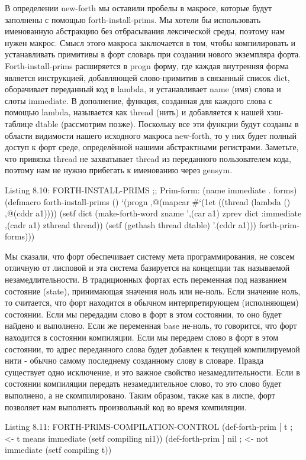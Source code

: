 В определении new-forth мы оставили пробелы в макросе, которые будут заполнены с помощью forth-install-prims. Мы хотели бы использовать именованную абстракцию без отбрасывания лексической среды, поэтому нам нужен макрос. Смысл этого макроса заключается в том, чтобы компилировать и устанавливать примитивы в форт словарь при создании нового экземпляра форта. Forth-install-prims расширяется в progn форму, где каждая внутренняя форма является инструкцией, добавляющей слово-примитив в связанный список dict, оборачивает переданный код в lambda, и устанавливает name (имя) слова и слоты immediate. В дополнение, функция, созданная для каждого слова с помощью lambda, называется как thread (нить) и добавляется к нашей хэш-таблице dtable (рассмотрим позже). Поскольку все эти функции будут созданы в области видимости нашего исходного макроса new-forth, то у них будет полный доступ к форт среде, определённой нашими абстрактными регистрами. Заметьте, что привязка thread не захватывает thread из переданного пользователем кода, поэтому нам не нужно прибегать к именованию через gensym.

Listing 8.10: FORTH-INSTALL-PRIMS
;; Prim-form: (name immediate . forms)
(defmacro forth-install-prims ()
‘(progn
,@(mapcar
#‘(1et ((thread (lambda ()
,@(cddr a1))))
(setf dict
(make-forth-word
zname ’,(car a1)
zprev dict
:immediate ,(cadr a1)
zthread thread))
(setf (gethash thread dtable)
’.(cddr a1)))
forth-prim-forms)))

Мы сказали, что форт обеспечивает систему мета программирования, не совсем отличную от лисповой и эта система базируется на концепции так называемой незамедлительности. В традиционных фортах есть переменная под названием состояние (state), принимающая значения ноль или не-ноль. Если значение ноль, то считается, что форт находится в обычном интерпретирующем (исполняющем) состоянии. Если мы передадим слово в форт в этом состоянии, то оно будет найдено и выполнено. Если же переменная base не-ноль, то говорится, что форт находится в состоянии компиляции. Если мы передаем слово в форт в этом состоянии, то адрес переданного слова будет добавлен к текущей компилируемой нити - обычно самому последнему созданному слову в словаре. Правда существует одно исключение, и это важное свойство незамедлительности. Если в состоянии компиляции передать незамедлительное слово, то это слово будет выполнено, а не скомпилировано. Таким образом, также как в лиспе, форт позволяет нам выполнять произвольный код во время компиляции.

Listing 8.11: FORTH-PRlMS-COMPILATION-CONTROL
(def-forth-prim [ t ; <- t means immediate
(setf compiling ni1))
(def-forth-prim ] nil ; <- not immediate
(setf compiling t))

